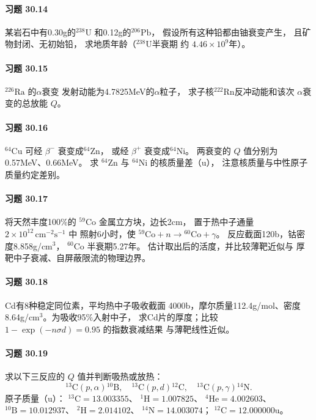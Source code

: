 \paragraph{习题 30.14}
某岩石中有0.30g的\({}^{238}\mathrm U\)
和0.12g的\({}^{206}\mathrm{Pb}\)，
假设所有这种铅都由铀衰变产生，
且矿物封闭、无初始铅，
求地质年龄（\({}^{238}\mathrm U\)半衰期
约 \(4.46\times10^9\)年）。
\paragraph{习题 30.15}
\({}^{226}\mathrm{Ra}\) 的\(\alpha\)衰变
发射动能为4.7825MeV的\(\alpha\)粒子，
求子核\({}^{222}\mathrm{Rn}\)反冲动能和该次
\(\alpha\)衰变的总放能 \(Q\)。
\paragraph{习题 30.16}
\({}^{64}\mathrm{Cu}\) 可经
\(\beta^-\) 衰变成\({}^{64}\mathrm{Zn}\)，
或经 \(\beta^+\) 衰变成\({}^{64}\mathrm{Ni}\)。
两衰变的 \(Q\) 值分别为0.57MeV、0.66MeV。
求 \({}^{64}\mathrm{Zn}\) 与
\({}^{64}\mathrm{Ni}\) 的核质量差（u），
注意核质量与中性原子质量约定差别。
\paragraph{习题 30.17}
将天然丰度100\%的
\({}^{59}\mathrm{Co}\) 金属立方块，边长2cm，
置于热中子通量
\(2\times10^{12}\,\mathrm{cm^{-2}s^{-1}}\) 中
照射6小时，使
\({}^{59}\mathrm{Co}+n\to{}^{60}\mathrm{Co}+\gamma\)。
反应截面120b，钴密度8.858g/cm$^3$，
\({}^{60}\mathrm{Co}\) 半衰期5.27年。
估计取出后的活度，并比较薄靶近似与
厚靶中子衰减、自屏蔽限流的物理边界。
\paragraph{习题 30.18}
Cd有8种稳定同位素，平均热中子吸收截面
4000b，摩尔质量112.4g/mol、密度
8.64g/cm$^3$。为吸收95\%入射中子，
求Cd片的厚度；比较
\(1-\exp(-n\sigma d)=0.95\) 的指数衰减结果
与薄靶线性近似。
\paragraph{习题 30.19}
求以下三反应的 \(Q\) 值并判断吸热或放热：
\[
{}^{13}\mathrm C(p,\alpha){}^{10}\mathrm B,\quad
{}^{13}\mathrm C(p,d){}^{12}\mathrm C,\quad
{}^{13}\mathrm C(p,\gamma){}^{14}\mathrm N.
\]
原子质量（u）：
\({}^{13}\mathrm C=13.003355\)、
\({}^{1}\mathrm H=1.007825\)、
\({}^{4}\mathrm{He}=4.002603\)、
\({}^{10}\mathrm B=10.012937\)、
\({}^{2}\mathrm H=2.014102\)、
\({}^{14}\mathrm N=14.003074\)；
\({}^{12}\mathrm C=12.000000\)u。

